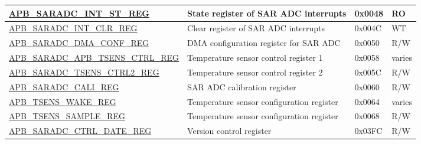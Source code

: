 \begin{longtable}{ | p{6.5cm} | p{6.7cm} | p{1.3cm} | p{1.6cm} | }
\hyperref[regdesc:APBSARADCINTSTREG]{APB\_SARADC\_INT\_ST\_REG} & State register of SAR ADC interrupts & 0x0048 & RO \\ \hline
\hyperref[regdesc:APBSARADCINTCLRREG]{APB\_SARADC\_INT\_CLR\_REG} & Clear register of SAR ADC interrupts & 0x004C & WT \\ \hline
\hyperref[regdesc:APBSARADCDMACONFREG]{APB\_SARADC\_DMA\_CONF\_REG} & DMA configuration register for SAR ADC & 0x0050 & R/W \\ \hline
\hyperref[regdesc:APBSARADCAPBTSENSCTRLREG]{APB\_SARADC\_APB\_TSENS\_CTRL\_REG} & Temperature sensor control register 1 & 0x0058 & varies \\ \hline
\hyperref[regdesc:APBSARADCTSENSCTRL2REG]{APB\_SARADC\_TSENS\_CTRL2\_REG} & Temperature sensor control register 2 & 0x005C & R/W \\ \hline
\hyperref[regdesc:APBSARADCCALIREG]{APB\_SARADC\_CALI\_REG} & SAR ADC calibration register & 0x0060 & R/W \\ \hline
\hyperref[regdesc:APBTSENSWAKEREG]{APB\_TSENS\_WAKE\_REG} & Temperature sensor configuration register & 0x0064 & varies \\ \hline
\hyperref[regdesc:APBTSENSSAMPLEREG]{APB\_TSENS\_SAMPLE\_REG} & Temperature sensor configuration register & 0x0068 & R/W \\ \hline
\hyperref[regdesc:APBSARADCCTRLDATEREG]{APB\_SARADC\_CTRL\_DATE\_REG} & Version control register & 0x03FC & R/W \\ \hline
\end{longtable}
